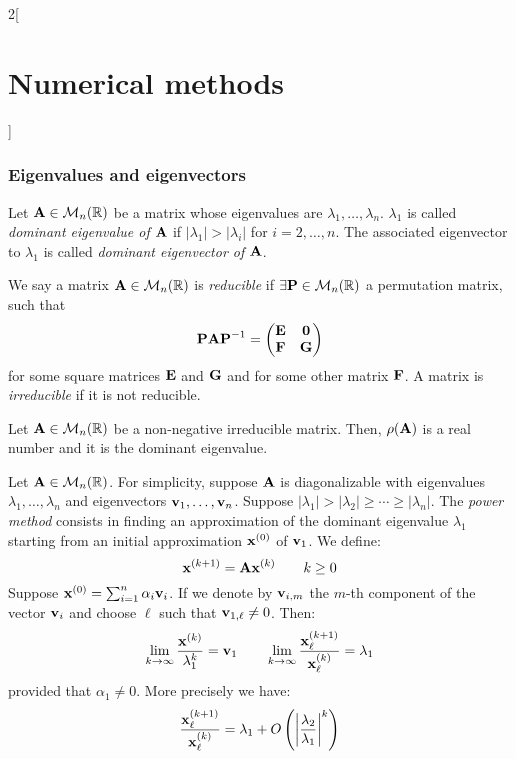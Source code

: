 \documentclass[../../../main.tex]{subfiles}
\begin{document}
\begin{multicols}{2}[\section{Numerical methods}]
  \subsubsection{Eigenvalues and eigenvectors}
  \begin{definition}
    Let $\boldsymbol{\mathrm{A}}\in\mathcal{M}_n(\mathbb{R})$ be a matrix whose eigenvalues are $\lambda_1,\ldots,\lambda_n$. $\lambda_1$ is called \textit{dominant eigenvalue of $\boldsymbol{\mathrm{A}}$} if $|\lambda_1|>|\lambda_i|$ for $i=2,\ldots,n$. The associated eigenvector to $\lambda_1$ is called \textit{dominant eigenvector of $\boldsymbol{\mathrm{A}}$}.
  \end{definition}
  \begin{definition}
    We say a matrix $\boldsymbol{\mathrm{A}}\in\mathcal{M}_n(\mathbb{R})$ is \textit{reducible} if $\exists\boldsymbol{\mathrm{P}}\in\mathcal{M}_n(\mathbb{R})$ a permutation matrix, such that $$\boldsymbol{\mathrm{P}}\boldsymbol{\mathrm{A}}\boldsymbol{\mathrm{P}}^{-1}=
      \begin{pmatrix}
        \boldsymbol{\mathrm{E}} & \boldsymbol{\mathrm{0}} \\
        \boldsymbol{\mathrm{F}} & \boldsymbol{\mathrm{G}}
      \end{pmatrix}$$ for some square matrices $\boldsymbol{\mathrm{E}}$ and $\boldsymbol{\mathrm{G}}$ and for some other matrix $\boldsymbol{\mathrm{F}}$. A matrix is \textit{irreducible} if it is not reducible.
  \end{definition}
  \begin{theorem}
    Let $\boldsymbol{\mathrm{A}}\in\mathcal{M}_n(\mathbb{R})$ be a non-negative irreducible matrix. Then, $\rho(\boldsymbol{\mathrm{A}})$ is a real number and it is the dominant eigenvalue.
  \end{theorem}
  \begin{method}
    Let $\boldsymbol{\mathrm{A}}\in\mathcal{M}_n(\mathbb{R})$. For simplicity, suppose $\boldsymbol{\mathrm{A}}$ is diagonalizable with eigenvalues $\lambda_1,\ldots,\lambda_n$ and eigenvectors $\boldsymbol{\mathrm{v}}_1,\ldots,\boldsymbol{\mathrm{v}}_n$. Suppose $|\lambda_1|>|\lambda_2|\geq\cdots\geq|\lambda_n|$. The \textit{power method} consists in finding an approximation of the dominant eigenvalue $\lambda_1$ starting from an initial approximation $\boldsymbol{\mathrm{x}}^{(0)}$ of $\boldsymbol{\mathrm{v}}_1$. We define: $$\boldsymbol{\mathrm{x}}^{(k+1)}=\boldsymbol{\mathrm{A}}\boldsymbol{\mathrm{x}}^{(k)}\qquad k\geq 0$$ Suppose $\boldsymbol{\mathrm{x}}^{(0)}=\sum_{i=1}^n\alpha_i\boldsymbol{\mathrm{v}}_i$. If we denote by $\boldsymbol{\mathrm{v}}_{i,m}$ the $m$-th component of the vector $\boldsymbol{\mathrm{v}}_i$ and choose $\ell$ such that $\boldsymbol{\mathrm{v}}_{1,\ell}\ne0$. Then: $$\lim_{k\to\infty}\frac{\boldsymbol{\mathrm{x}}^{(k)}}{\lambda_1^k}=\boldsymbol{\mathrm{v}}_1\qquad\lim_{k\to\infty}\frac{\boldsymbol{\mathrm{x}}_\ell^{(k+1)}}{\boldsymbol{\mathrm{x}}_\ell^{(k)}}=\lambda_1$$ provided that $\alpha_1\ne0$. More precisely we have: $$\frac{\boldsymbol{\mathrm{x}}_\ell^{(k+1)}}{\boldsymbol{\mathrm{x}}_\ell^{(k)}}=\lambda_1+O\left(\left|\frac{\lambda_2}{\lambda_1}\right|^k\right)$$

\end{method}
\end{multicols}
\end{document}
